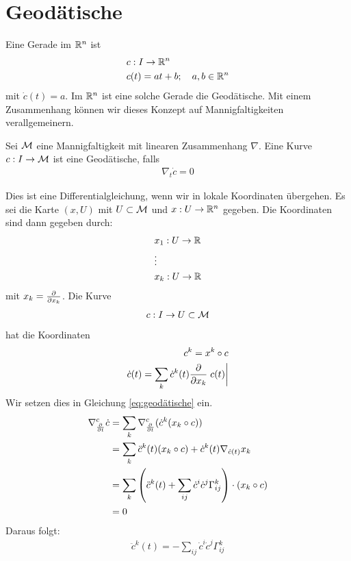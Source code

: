 
\section{Geodätische}
Eine Gerade im $\mathbb{R}^n$ ist
\begin{align}
&c: I \to \mathbb{R}^n\\
&c(t) = a t + b; \quad a,b\in\mathbb{R}^n
\end{align}
mit $\dot{c}(t)=a$.
Im $\mathbb{R}^n$ ist eine solche Gerade die Geodätische.
Mit einem Zusammenhang können wir dieses Konzept auf Mannigfaltigkeiten verallgemeinern.
\begin{defs}[Geodätische]
Sei $\mathcal{M}$ eine Mannigfaltigkeit mit linearen Zusammenhang $\nabla$.
Eine Kurve $c : I \to \mathcal{M}$ ist eine Geodätische, falls
\begin{align}
\label{eq:geodätische}
\nabla_t \dot{c} = 0
\end{align}
\end{defs}
Dies ist eine Differentialgleichung, wenn wir in lokale Koordinaten übergehen.
Es sei die Karte $(x, U)$ mit $U \subset \mathcal{M}$ und $x: U \to \mathbb{R}^n$ gegeben.
Die Koordinaten sind dann gegeben durch:
\begin{align*}
&x_1 : U \to \mathbb{R}\\
&\vdots\\
&x_k : U \to \mathbb{R}
\end{align*}
mit $x_k = \pdv{x_k}$.
Die Kurve
\begin{align*}
c : I \to U \subset \mathcal{M}
\end{align*}
hat die Koordinaten
\begin{align*}
c^k = x^k \circ c\\
\dot{c}(t) = \sum_k \dot{c}^k(t) \pdv{x_k} \eval{c(t)}
\end{align*}
Wir setzen dies in Gleichung \ref{eq:geodätische} ein.
\begin{align*}
\nabla^c_{\pdv{t}} \dot{c} &= \sum_k \nabla^c_{\pdv{t}} (\dot{c}^k (x_k \circ c))\\
&= \sum_k \ddot{c}^k (t) (x_k \circ c) + \dot{c}^k (t) \nabla_{\dot{c}(t)} x_k\\
&= \sum_k \left( \ddot{c}^k (t) + \sum_{ij} \dot{c}^i \dot{c}^j \Gamma^k_{ij} \right) \cdot (x_k \circ c) \\
&= 0 
\end{align*}
Daraus folgt:
\begin{align}
\ddot{c}^k (t) = - \sum_{ij} \dot{c}^i \dot{c}^j \Gamma^k_{ij}
\end{align}
